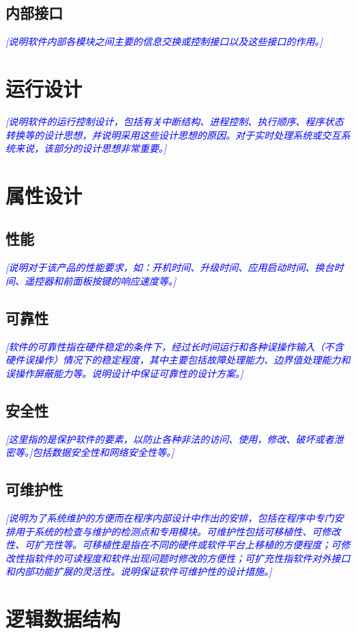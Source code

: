 \documentclass[12pt,a4pape，titlepager]{article}
\newcommand{\bluefont}[1]{\textcolor{blue}{\emph{[#1]}}}
\begin{document}
	\subsection{内部接口}{
		\bluefont{说明软件内部各模块之间主要的信息交换或控制接口以及这些接口的作用。}}
	
	\section{运行设计}{
		\bluefont{说明软件的运行控制设计，包括有关中断结构、进程控制、执行顺序、程序状态转换等的设计思想，并说明采用这些设计思想的原因。对于实时处理系统或交互系统来说，该部分的设计思想非常重要。}
	}
	
	\section{属性设计}
	\subsection{性能}{
		\bluefont{说明对于该产品的性能要求，如：开机时间、升级时间、应用启动时间、换台时间、遥控器和前面板按键的响应速度等。}
	}
	\subsection{可靠性}{
		\bluefont{软件的可靠性指在硬件稳定的条件下，经过长时间运行和各种误操作输入（不含硬件误操作）情况下的稳定程度，其中主要包括故障处理能力、边界值处理能力和误操作屏蔽能力等。说明设计中保证可靠性的设计方案。}
	}
	\subsection{安全性}{
		\bluefont{这里指的是保护软件的要素，以防止各种非法的访问、使用，修改、破坏或者泄密等。]包括数据安全性和网络安全性等。}
	}
	\subsection{可维护性}{
		\bluefont{说明为了系统维护的方便而在程序内部设计中作出的安排，包括在程序中专门安排用于系统的检查与维护的检测点和专用模块。可维护性包括可移植性、可修改性、可扩充性等。可移植性是指在不同的硬件或软件平台上移植的方便程度；可修改性指软件的可读程度和软件出现问题时修改的方便性；可扩充性指软件对外接口和内部功能扩展的灵活性。说明保证软件可维护性的设计措施。}
	}
	
	\section{逻辑数据结构}
\end{document}
